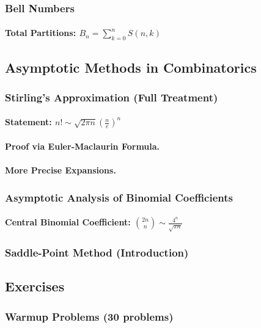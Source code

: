 \subsubsection{Bell Numbers}
\paragraph{Total Partitions: $B_n = \sum_{k=0}^{n} S(n,k)$}

\subsection{Asymptotic Methods in Combinatorics}
\label{subsec:asymptotic-combinatorics}

\subsubsection{Stirling's Approximation (Full Treatment)}
\paragraph{Statement: $n! \sim \sqrt{2\pi n} \left(\frac{n}{e}\right)^n$}
\paragraph{Proof via Euler-Maclaurin Formula.}
\paragraph{More Precise Expansions.}

\subsubsection{Asymptotic Analysis of Binomial Coefficients}
\paragraph{Central Binomial Coefficient: $\binom{2n}{n} \sim \frac{4^n}{\sqrt{\pi n}}$}

\subsubsection{Saddle-Point Method (Introduction)}

\subsection{Exercises}
\subsubsection{Warmup Problems (30 problems)}
